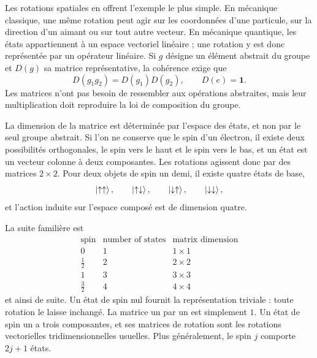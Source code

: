 Les rotations spatiales en offrent l’exemple le plus simple. En mécanique classique, une même rotation peut agir sur les coordonnées d’une particule, sur la direction d’un aimant ou sur tout autre vecteur. En mécanique quantique, les états appartiennent à un espace vectoriel linéaire ; une rotation y est donc représentée par un opérateur linéaire. Si \(g\) désigne un élément abstrait du groupe et \(D(g)\) sa matrice représentative, la cohérence exige que
\begin{equation}
D(g_1g_2)=D(g_1)D(g_2),
\qquad
D(e)=\boldsymbol 1.
\end{equation}
Les matrices n’ont pas besoin de ressembler aux opérations abstraites, mais leur multiplication doit reproduire la loi de composition du groupe.

La dimension de la matrice est déterminée par l’espace des états, et non par le seul groupe abstrait. Si l’on ne conserve que le spin d’un électron, il existe deux possibilités orthogonales, le spin vers le haut et le spin vers le bas, et un état est un vecteur colonne à deux composantes. Les rotations agissent donc par des matrices \(2\times2\). Pour deux objets de spin un demi, il existe quatre états de base,
\begin{equation}
\left\lvert\uparrow\uparrow\right\rangle,\qquad
\left\lvert\uparrow\downarrow\right\rangle,\qquad
\left\lvert\downarrow\uparrow\right\rangle,\qquad
\left\lvert\downarrow\downarrow\right\rangle,
\end{equation}
et l’action induite sur l’espace composé est de dimension quatre.

La suite familière est
\begin{equation}
\begin{array}{c|c|c}
\text{spin} & \text{number of states} & \text{matrix dimension}\\
\hline
0 & 1 & 1\times1\\
\frac12 & 2 & 2\times2\\
1 & 3 & 3\times3\\
\frac32 & 4 & 4\times4
\end{array}
\end{equation}
et ainsi de suite. Un état de spin nul fournit la représentation triviale : toute rotation le laisse inchangé. La matrice un par un est simplement \(1\). Un état de spin un a trois composantes, et ses matrices de rotation sont les rotations vectorielles tridimensionnelles usuelles. Plus généralement, le spin \(j\) comporte \(2j+1\) états.

